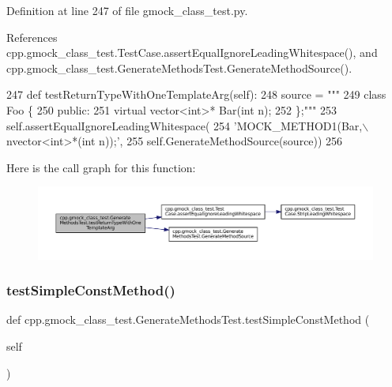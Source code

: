 Definition at line 247 of file gmock\+\_\+class\+\_\+test.\+py.



References cpp.\+gmock\+\_\+class\+\_\+test.\+Test\+Case.\+assert\+Equal\+Ignore\+Leading\+Whitespace(), and cpp.\+gmock\+\_\+class\+\_\+test.\+Generate\+Methods\+Test.\+Generate\+Method\+Source().


\begin{DoxyCode}
247   \textcolor{keyword}{def }testReturnTypeWithOneTemplateArg(self):
248     source = \textcolor{stringliteral}{"""}
249 \textcolor{stringliteral}{class Foo \{}
250 \textcolor{stringliteral}{ public:}
251 \textcolor{stringliteral}{  virtual vector<int>* Bar(int n);}
252 \textcolor{stringliteral}{\};"""}
253     self.assertEqualIgnoreLeadingWhitespace(
254         \textcolor{stringliteral}{'MOCK\_METHOD1(Bar,\(\backslash\)nvector<int>*(int n));'},
255         self.GenerateMethodSource(source))
256 
\end{DoxyCode}
Here is the call graph for this function\+:
\nopagebreak
\begin{figure}[H]
\begin{center}
\leavevmode
\includegraphics[width=350pt]{classcpp_1_1gmock__class__test_1_1GenerateMethodsTest_a747b7b1b9da071eb8e1e2b84c7ee3614_cgraph}
\end{center}
\end{figure}
\mbox{\label{classcpp_1_1gmock__class__test_1_1GenerateMethodsTest_ad8cb9c2f99fa65c7d3fee054dde0e30d}} 
\subsubsection{\texorpdfstring{test\+Simple\+Const\+Method()}{testSimpleConstMethod()}}
{\footnotesize\ttfamily def cpp.\+gmock\+\_\+class\+\_\+test.\+Generate\+Methods\+Test.\+test\+Simple\+Const\+Method (\begin{DoxyParamCaption}\item[{}]{self }\end{DoxyParamCaption})}



